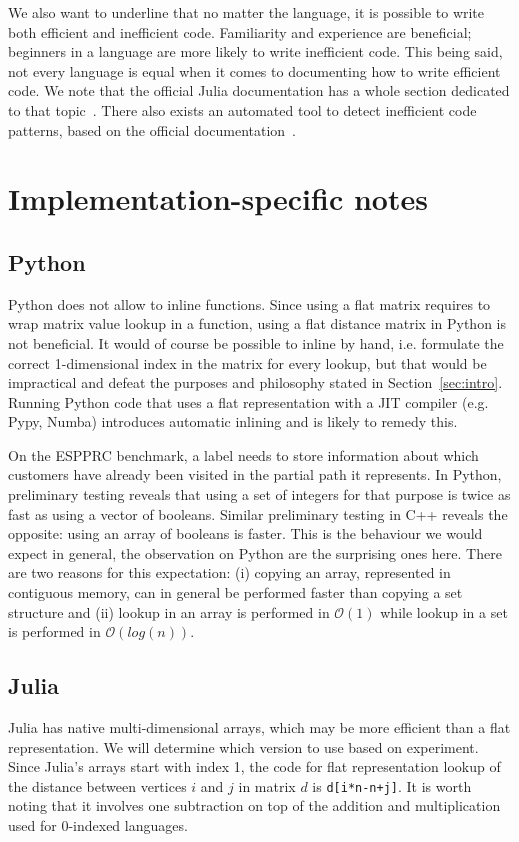 \documentclass[11pt,a4paper,notitlepage]{article}
\begin{document}
We also want to underline that no matter the language, it is possible
to write both efficient and inefficient code. Familiarity and
experience are beneficial; beginners in a language are more likely to
write inefficient code. This being said, not every language is equal
when it comes to documenting how to write efficient code. We note that
the official Julia documentation has a whole section dedicated to that
topic~\cite{julia-performance}. There also exists an automated tool to
detect inefficient code patterns, based on the official
documentation~\cite{julia-traceur}.

\section{Implementation-specific notes}
\subsection{Python}
Python does not allow to inline functions. Since using a flat matrix
requires to wrap matrix value lookup in a function, using a flat distance
matrix in Python is not beneficial. It would of course be possible to
inline by hand, i.e. formulate the correct 1-dimensional index in the
matrix for every lookup, but that would be impractical and defeat the
purposes and philosophy stated in Section~\ref{sec:intro}.
Running Python code that uses a flat representation with a JIT compiler
(e.g. Pypy, Numba) introduces automatic inlining and is likely to
remedy this.

On the ESPPRC benchmark, a label needs to store information about
which customers have already been visited in the partial path it
represents. In Python, preliminary testing reveals that using a set of
integers for that purpose is twice as fast as using a vector of
booleans. Similar preliminary testing in C++ reveals the opposite:
using an array of booleans is faster. This is the behaviour we would
expect in general, the observation on Python are the surprising ones
here. There are two reasons for this expectation: (i) copying an array,
represented in contiguous memory, can in general be performed faster
than copying a set structure and (ii) lookup in an array is performed
in $\mathcal{O}(1)$ while lookup in a set is performed in
$\mathcal{O}(log(n))$.

\subsection{Julia}
Julia has native multi-dimensional arrays, which may be more efficient
than a flat representation. We will determine which version to use
based on experiment. Since Julia's arrays start with index 1, the code
for flat representation lookup of the distance between vertices $i$
and $j$ in matrix $d$ is \lstinline{d[i*n-n+j]}. It is worth noting
that it involves one subtraction on top of the addition and
multiplication used for 0-indexed languages.
\end{document}
